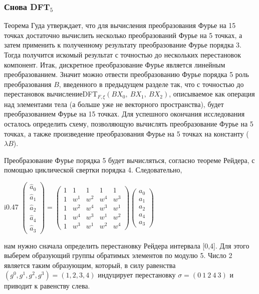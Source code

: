\documentclass{mai_book}
\begin{document}
\subsubsection{Снова D{\footnotesize FT}$_5$}
Теорема Гуда утверждает, что для вычисления преобразования Фурье на 15 точках достаточно вычислить несколько преобразований Фурье на 5 точках, а затем применить к полученному результату преобразование Фурье порядка 3. Тогда получится искомый результат с точностью до нескольких перестановок компонент. Итак, дискретное преобразование Фурье является линейным преобразованием. Значит можно отвести преобразованию Фурье порядка 5 роль преобразования $B$, введенного в предыдущем разделе так, что с точностью до перестановок вычисление\linebreak D{\footnotesize FT}$_{F, \xi}(BX_0,\ BX_1,\ BX_2)$, описываемое как операция над элементами тела (а больше уже не векторного пространства), будет преобразованием Фурье на 15 точках. Для успешного окончания исследования осталось определить схему, позволяющую вычислять преобразование Фурье на 5 точках, а также произведение преобразования Фурье на 5 точках на константу ($\lambda B$).\par 
Преобразование Фурье порядка 5 будет вычисляться, согласно теореме Рейдера, с помощью циклической свертки порядка 4. Следовательно,\begin{wrapfigure}{i}{0.47\textwidth}
$\begin{pmatrix} \hat{a}_0 \\ \hat{a}_1 \\ \hat{a}_2 \\ \hat{a}_4 \\ \hat{a}_3 \end{pmatrix} = \begin{pmatrix} 1 & 1 & 1 & 1 & 1 \\ 1 & w^1 & w^2 & w^4 & w^3 \\ 1 & w^2 & w^4 & w^3 & w^1 \\ 1 & w^4 & w^3 & w^1 & w^2 \\ 1 & w^3 & w^1 & w^2 & w^4 \end{pmatrix} \begin{pmatrix} a_0 \\ a_1 \\ a_2 \\ a_4 \\ a_3 \end{pmatrix}$
\end{wrapfigure} нам нужно сначала определить перестановку Рейдера интервала [0,4]. Для этого выберем  образующий группы обратимых элементов по модулю 5. Число 2 является таким образующим, который, в силу равенства $(g^0,g^1,g^2,g^3)=(1,2,3,4)$ индуцирует перестановку $\sigma = (0\ 1\ 2\ 4\ 3)$ и приводит к равенству слева.\par
\end{document}

